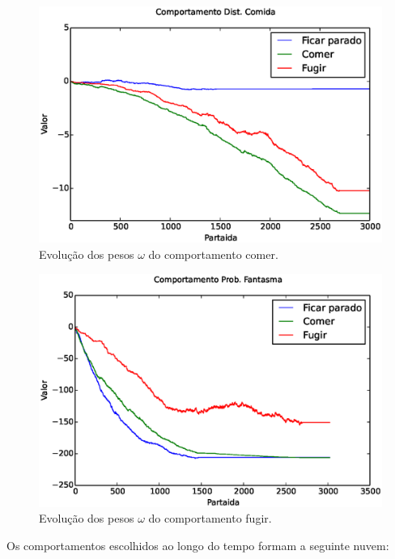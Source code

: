 \begin{figure}[H]
    \centering
    \includegraphics[width=120mm]{images/3_behaviors_small_map/weights____pol__DistComida}
    \caption{\label{img:3ComportamentosMapaPequeno:ComportamentoComer}Evolução dos pesos $ \omega $ do comportamento comer.}
\end{figure}

\begin{figure}[H]
    \centering
    \includegraphics[width=120mm]{images/3_behaviors_small_map/weights____pol__ProbFantasma}
    \caption{\label{img:3ComportamentosMapaPequeno:ComportamentoFugir}Evolução dos pesos $ \omega $ do comportamento fugir.}
\end{figure}


Os comportamentos escolhidos ao longo do tempo formam a seguinte nuvem:

